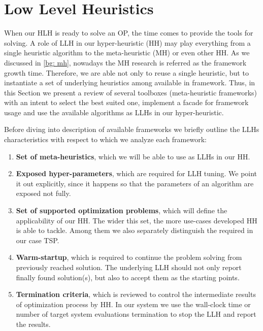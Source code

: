 \section{Low Level Heuristics}\label{impl: LLH}
When our HLH is ready to solve an OP, the time comes to provide the tools for solving. A role of LLH in our hyper-heuristic (HH) may play everything from a single heuristic algorithm to the meta-heuristic (MH) or even other HH. As we discussed in \cref{bg: mh}, nowadays the MH research is referred as the framework growth time. Therefore, we are able not only to reuse a single heuristic, but to instantiate a set of underlying heuristics among available in framework. Thus, in this Section we present a review of several toolboxes (meta-heuristic frameworks) with an intent to select the best suited one, implement a facade for framework usage and use the available algorithms as LLHs in our hyper-heuristic.

Before diving into description of available frameworks we briefly outline the LLHs characteristics with respect to which we analyze each framework:
\begin{enumerate}
	\item \textbf{Set of meta-heuristics}, which we will be able to use as LLHs in our HH.
	
	\item \textbf{Exposed hyper-parameters}, which are required for LLH tuning. We point it out explicitly, since it happens so that the parameters of an algorithm are exposed not fully.
	
	\item \textbf{Set of supported optimization problems}, which will define the applicability of our HH. The wider this set, the more use-cases developed HH is able to tackle. Among them we also separately distinguish the required in our case TSP.
	
	\item \textbf{Warm-startup}, which is required to continue the problem solving from previously reached solution. The underlying LLH should not only report finally found solution(s), but also to accept them as the starting points.
	
	\item \textbf{Termination criteria}, which is reviewed to control the intermediate results of optimization process by HH. In our system we use the wall-clock time or number of target system evaluations termination to stop the LLH and report the results.
\end{enumerate}


